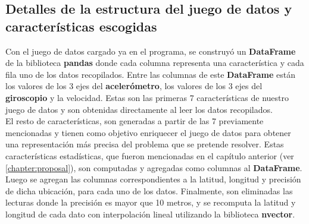 	\subsection{Detalles de la estructura del juego de datos y características escogidas}
		Con el juego de datos cargado ya en el programa, se construyó un \textbf{DataFrame} de la biblioteca \textbf{pandas} donde cada columna representa
		una característica y cada fila uno de los datos recopilados. Entre las columnas de este \textbf{DataFrame} están los valores de los 3 ejes del \textbf
		{acelerómetro}, los valores de los 3 ejes del \textbf{giroscopio} y la velocidad. Estas son las primeras 7 características de nuestro juego de datos
		y son obtenidas directamente al leer los datos recopilados.\\
		\indent El resto de características, son generadas a partir de las 7 previamente mencionadas y tienen como objetivo
		enriquecer el juego de datos para obtener una representación más precisa del problema que se pretende resolver. Estas características estadísticas,
		que fueron mencionadas en el capítulo anterior (ver \ref{chapter:proposal}), son computadas y agregadas como columnas al \textbf{DataFrame}.
		Luego se agregan las columnas correspondientes a la latitud, longitud y precisión de dicha ubicación, para cada uno de los datos. Finalmente, son
		eliminadas las lecturas donde la precisión es mayor que 10 metros, y se recomputa la latitud y longitud de cada dato con interpolación lineal
		utilizando la biblioteca \textbf{nvector}.


